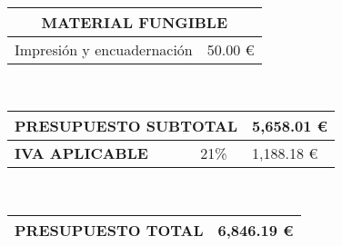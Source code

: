 \vspace{1cm}

\ \hfill
\begin{tabular}{ |p{5cm}|p{2cm}|  }
	\hline
	\multicolumn{2}{|c|}{\textbf{MATERIAL FUNGIBLE}} \\
	\hline
	Impresión y encuadernación & \hfill 50.00 \euro \\
	\hline
\end{tabular}

\vspace{1cm}

\ \hfill
\begin{tabular}{ |p{4cm}|p{2cm}|p{2cm}|  }
	\hline
	\multicolumn{2}{|l|}{\textbf{PRESUPUESTO SUBTOTAL}} & \hfill 5,658.01 \euro \\
	\hline
	\textbf{IVA APLICABLE} & 21\% & \hfill 1,188.18 \euro \\
	\hline
\end{tabular}

\vspace{1cm}

\ \hfill
\begin{tabular}{ |p{5cm}|p{2cm}|}
	\hline
	\textbf{PRESUPUESTO TOTAL} & \hfill 6,846.19 \euro \\
	\hline
\end{tabular}
